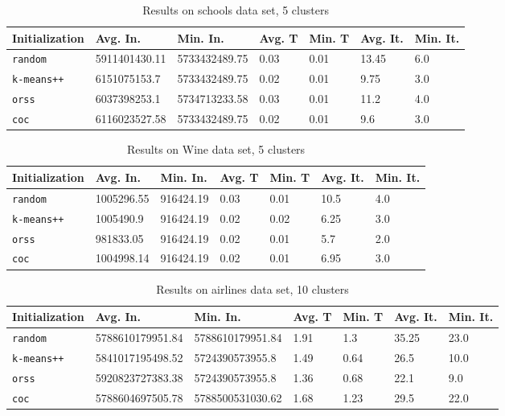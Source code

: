 \documentclass[twoside, 11pt]{article}
\begin{document}
		\begin{table}[p]
			\begin{center}
				\begin{tabular}{|l|l|l|l|l|l|l|}
					\hline
					Initialization & Avg. In. & Min. In. & Avg. T & Min. T & Avg. It. & Min. It.\\\hline
					\texttt{random} & 5911401430.11 & 5733432489.75 & 0.03 & 0.01 & 13.45 & 6.0\\\hline
					\texttt{k-means++} & 6151075153.7 & 5733432489.75 & 0.02 & 0.01 & 9.75 & 3.0\\\hline
					\texttt{orss} & 6037398253.1 & 5734713233.58 & 0.03 & 0.01 & 11.2 & 4.0\\\hline
					\texttt{coc} & 6116023527.58 & 5733432489.75 & 0.02 & 0.01 & 9.6 & 3.0\\\hline
				\end{tabular}
				\caption{Results on schools data set, 5 clusters}
				\label{tbl:schools5}
			\end{center}
		\end{table}
		
		\begin{table}[p]
			\begin{center}
				\begin{tabular}{|l|l|l|l|l|l|l|}
					\hline
					Initialization & Avg. In. & Min. In. & Avg. T & Min. T & Avg. It. & Min. It.\\\hline
					\texttt{random} & 1005296.55 & 916424.19 & 0.03 & 0.01 & 10.5 & 4.0\\\hline
					\texttt{k-means++} & 1005490.9 & 916424.19 & 0.02 & 0.02 & 6.25 & 3.0\\\hline
					\texttt{orss} & 981833.05 & 916424.19 & 0.02 & 0.01 & 5.7 & 2.0\\\hline
					\texttt{coc} & 1004998.14 & 916424.19 & 0.02 & 0.01 & 6.95 & 3.0\\\hline
				\end{tabular}
				\caption{Results on Wine data set, 5 clusters}
				\label{tbl:Wine5}
			\end{center}
		\end{table}
		
		\begin{table}[p]
			\begin{center}
				\begin{tabular}{|l|l|l|l|l|l|l|}
					\hline
					Initialization & Avg. In. & Min. In. & Avg. T & Min. T & Avg. It. & Min. It.\\\hline
					\texttt{random} & 5788610179951.84 & 5788610179951.84 & 1.91 & 1.3 & 35.25 & 23.0\\\hline
					\texttt{k-means++} & 5841017195498.52 & 5724390573955.8 & 1.49 & 0.64 & 26.5 & 10.0\\\hline
					\texttt{orss} & 5920823727383.38 & 5724390573955.8 & 1.36 & 0.68 & 22.1 & 9.0\\\hline
					\texttt{coc} & 5788604697505.78 & 5788500531030.62 & 1.68 & 1.23 & 29.5 & 22.0\\\hline
				\end{tabular}
				\caption{Results on airlines data set, 10 clusters}
				\label{tbl:airlines10}
			\end{center}
		\end{table}
		
\end{document}
